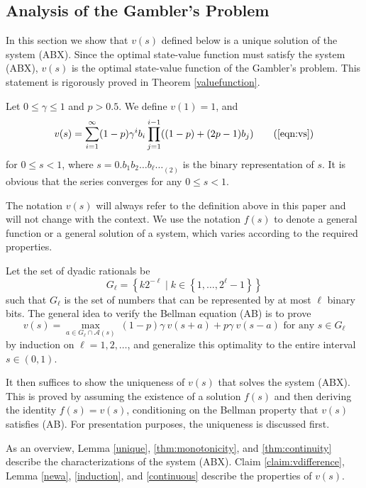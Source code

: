 \documentclass{article}
\theoremstyle{named}
\newcommand{\cA}{\mathcal{A}}
\newcommand{\set}[1]{\left\{#1\right\}}
\begin{document}
\subsection{Analysis of the Gambler's Problem}
\label{sec:abc1}

In this section we show that $v(s)$ defined below is a unique solution of the system ({ABX}). Since the optimal state-value function must satisfy the system ({ABX}), $v(s)$ is the optimal state-value function of the Gambler's problem. This statement is rigorously proved in Theorem \ref{valuefunction}.

Let $0\leq\gamma\leq 1$ and $p> 0.5$. We define $v(1)=1$, and 
\begin{equation*}
v(s)=\sum_{i=1}^\infty (1-p)\gamma^i b_i\prod_{j=1}^{i-1}((1-p)+(2p-1)b_j) \tag{\ref{eqn:vs}}
\end{equation*}
for $0\leq s<1$, where $s={0.b_1b_2\dots b_\ell\dots}_{(2)}$ is the binary representation of $s$. It is obvious that the series converges for any $0\leq s<1$.

The notation $v(s)$ will always refer to the definition above in this paper and will not change with the context. We use the notation $f(s)$ to denote a general function or a general solution of a system, which varies according to the required properties.

Let the set of dyadic rationals be
\begin{equation}
G_\ell=\set{k2^{-\ell}\mid k\in \set{1,\dots,2^\ell-1}}
\end{equation}
such that $G_\ell$ is the set of numbers that can be represented by at most $\ell$ binary bits. 
The general idea to verify the Bellman equation (AB) is to prove 
\[
v(s)=\max_{a\in G_{\ell}\cap \cA(s)}\ (1-p)\gamma\ v(s+a)+p\gamma\ v(s-a)  \text{ for any } s \in G_{\ell}
\] 
by induction on $\ell=1,2,\dots$, and generalize this optimality to the entire interval $s\in (0,1)$. 

It then suffices to show the uniqueness of $v(s)$ that solves the system ({ABX}). This is proved by assuming the existence of a solution $f(s)$ and then deriving the identity $f(s)=v(s)$, conditioning on the Bellman property that $v(s)$ satisfies ({AB}). For presentation purposes, the uniqueness is discussed first.


As an overview, Lemma \ref{unique}, \ref{thm:monotonicity}, and \ref{thm:continuity} describe the characterizations of the system ({ABX}). Claim \ref{claim:vdifference}, Lemma \ref{newa}, \ref{induction}, and \ref{continuous} describe the properties of $v(s)$.
\end{document}
